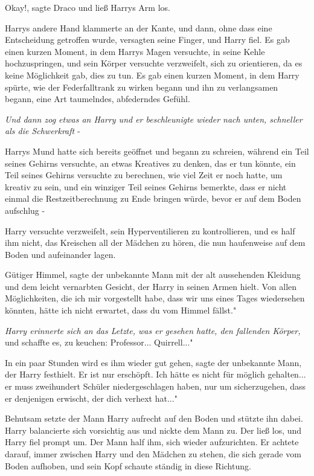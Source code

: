 \glqq Okay!\grqq{}, sagte Draco und ließ Harrys Arm los.

Harrys andere Hand klammerte an der Kante, und dann, ohne dass eine Entscheidung
getroffen wurde, versagten seine Finger, und Harry fiel. Es gab einen kurzen
Moment, in dem Harrys Magen versuchte, in seine Kehle hochzuspringen, und sein
Körper versuchte verzweifelt, sich zu orientieren, da es keine Möglichkeit gab,
dies zu tun. Es gab einen kurzen Moment, in dem Harry spürte, wie der
Federfalltrank zu wirken begann und ihn zu verlangsamen begann, eine Art
taumelndes, abfederndes Gefühl.

\emph{Und dann zog etwas an Harry und er beschleunigte wieder nach unten,
schneller als die Schwerkraft }-

Harrys Mund hatte sich bereits geöffnet und begann zu schreien, während ein Teil
seines Gehirns versuchte, an etwas Kreatives zu denken, das er tun könnte, ein
Teil seines Gehirns versuchte zu berechnen, wie viel Zeit er noch hatte, um
kreativ zu sein, und ein winziger Teil seines Gehirns bemerkte, dass er nicht
einmal die Restzeitberechnung zu Ende bringen würde, bevor er auf dem Boden
aufschlug -

Harry versuchte verzweifelt, sein Hyperventilieren zu kontrollieren, und es half
ihm nicht, das Kreischen all der Mädchen zu hören, die nun haufenweise auf dem
Boden und aufeinander lagen.

\glqq Gütiger Himmel\grqq{}, sagte der unbekannte Mann mit der alt aussehenden
Kleidung und dem leicht vernarbten Gesicht, der Harry in seinen Armen hielt.
\glqq Von allen Möglichkeiten, die ich mir vorgestellt habe, dass wir uns eines
Tages wiedersehen könnten, hätte ich nicht erwartet, dass du vom Himmel fällst."

\emph{ Harry erinnerte sich an das Letzte, was er gesehen hatte, den fallenden
Körper, }und schaffte es, zu keuchen: \glqq Professor... Quirrell..."

\glqq In ein paar Stunden wird es ihm wieder gut gehen\grqq{}, sagte der
unbekannte Mann, der Harry festhielt. \glqq Er ist nur erschöpft. Ich hätte es
nicht für möglich gehalten... er muss zweihundert Schüler niedergeschlagen
haben, nur um sicherzugehen, dass er denjenigen erwischt, der dich verhext
hat..."

Behutsam setzte der Mann Harry aufrecht auf den Boden und stützte ihn dabei.
Harry balancierte sich vorsichtig aus und nickte dem Mann zu. Der ließ los, und
Harry fiel prompt um. Der Mann half ihm, sich wieder aufzurichten. Er achtete
darauf, immer zwischen Harry und den Mädchen zu stehen, die sich gerade vom
Boden aufhoben, und sein Kopf schaute ständig in diese Richtung.


